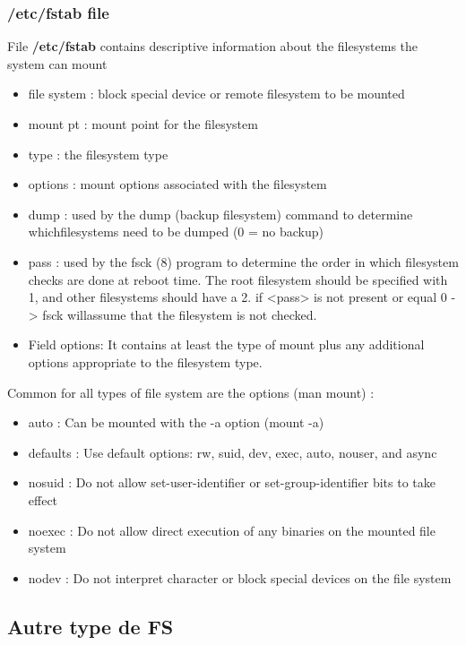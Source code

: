 \documentclass[resume]{subfiles}
\begin{document}
\subsubsection{/etc/fstab file}
File \textbf{/etc/fstab} contains descriptive information about the filesystems the system can mount
\begin{itemize}
    \item file system : block special device or remote filesystem to be mounted
    \item mount pt : mount point for the filesystem
    \item type : the filesystem type
    \item options : mount options associated with the filesystem
    \item dump : used by the dump (backup filesystem) command to determine whichfilesystems need to be dumped (0 = no backup)
    \item pass : used by the fsck (8) program to determine the order in which filesystem checks are done at reboot time. The root filesystem should be specified with 1, and other filesystems should have a 2. if <pass> is not present or equal 0 -> fsck willassume that the filesystem is not checked.
    \item Field options: It contains at least the type of mount plus any additional options appropriate to the filesystem type.
\end{itemize}
Common for all types of file system are the options (man mount) :
\begin{itemize}
    \item auto : Can be mounted with the -a option (mount -a)
    \item defaults : Use default options: rw, suid, dev, exec, auto, nouser, and async
    \item nosuid : Do not allow set-user-identifier or set-group-identifier bits to take effect
    \item noexec : Do not allow direct execution of any binaries on the mounted file system
    \item nodev : Do not interpret character or block special devices on the file system
\end{itemize}


\subsection{Autre type de FS}
\end{document}
